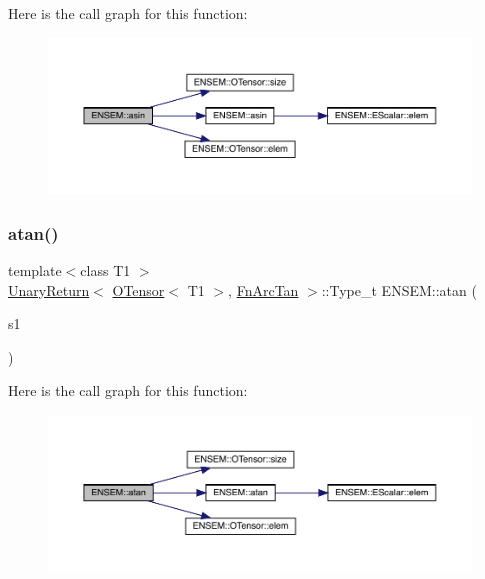 Here is the call graph for this function\+:\nopagebreak
\begin{figure}[H]
\begin{center}
\leavevmode
\includegraphics[width=350pt]{de/d87/group__obstensor_gac2f3c33b51a9ad0b1d382eb02ba089df_cgraph}
\end{center}
\end{figure}
\mbox{\label{group__obstensor_gad2ff83f1912b705b331d775f9c4dfb5a}} 
\subsubsection{\texorpdfstring{atan()}{atan()}}
{\footnotesize\ttfamily template$<$class T1 $>$ \\
\mbox{\hyperlink{structENSEM_1_1UnaryReturn}{Unary\+Return}}$<$ \mbox{\hyperlink{classENSEM_1_1OTensor}{O\+Tensor}}$<$ T1 $>$, \mbox{\hyperlink{structENSEM_1_1FnArcTan}{Fn\+Arc\+Tan}} $>$\+::Type\+\_\+t E\+N\+S\+E\+M\+::atan (\begin{DoxyParamCaption}\item[{const \mbox{\hyperlink{classENSEM_1_1OTensor}{O\+Tensor}}$<$ T1 $>$ \&}]{s1 }\end{DoxyParamCaption})\hspace{0.3cm}{\ttfamily [inline]}}

Here is the call graph for this function\+:\nopagebreak
\begin{figure}[H]
\begin{center}
\leavevmode
\includegraphics[width=350pt]{de/d87/group__obstensor_gad2ff83f1912b705b331d775f9c4dfb5a_cgraph}
\end{center}
\end{figure}
\mbox{\label{group__obstensor_ga167556ae7bebc48d05e83003206f36dd}} 
